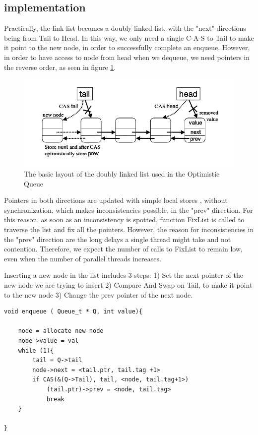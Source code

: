 \subsection{implementation}
Practically, the link list becomes a doubly linked list, with the "next" directions being from Tail to Head. In this way, we only need a single C-A-S to Tail to make it point to the new node, in order to successfully complete an enqueue. However, in order to have access to node from head when we dequeue, we need pointers in the reverse order, as seen in figure \ref{optimistic_struct}.

\begin{figure}
 \centering
  \includegraphics[scale=0.6]{optimistic_struct.png}
 \caption{ The basic layout of the doubly linked list used in the Optimistic Queue}
\label{optimistic_struct}
\end{figure}

Pointers in both directions are updated with simple local stores , without synchronization, which makes inconsistencies possible, in the "prev" direction. For this reason, as soon as an inconsistency is spotted, function FixList is called to traverse the list and fix all the pointers. However, the reason for inconsistencies in the "prev" direction are the long delays a single thread might take and not contention. Therefore, we expect the number of calls to FixList to remain low, even when the number of parallel threads increases.

Inserting a new node in the list includes 3 steps:
1) Set the next pointer of the new node we are trying to insert
2) Compare And Swap on Tail, to make it point to the new node
3) Change the prev pointer of the next node.

\begin{lstlisting}
void enqueue ( Queue_t * Q, int value){
	
	node = allocate new node
	node->value = val
	while (1){
		tail = Q->tail
		node->next = <tail.ptr, tail.tag +1>
		if CAS(&(Q->Tail), tail, <node, tail.tag+1>)
			(tail.ptr)->prev = <node, tail.tag>
			break
	}

}

\end{lstlisting}
